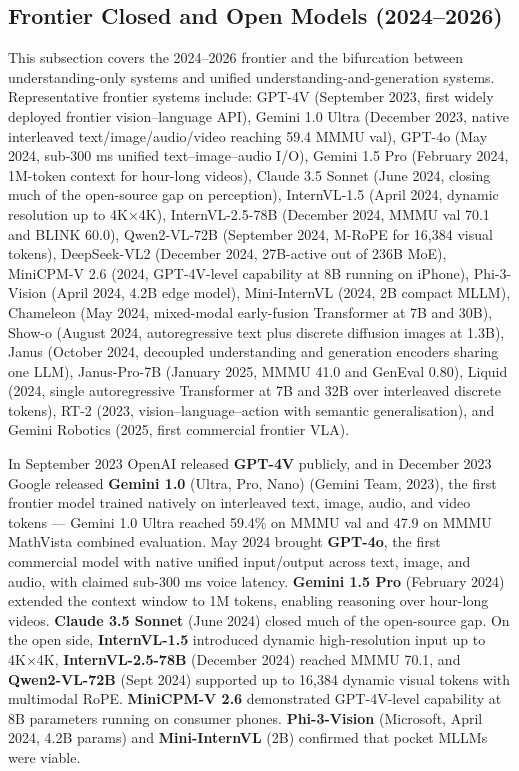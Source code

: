 \documentclass{article}
\begin{document}
\subsection{Frontier Closed and Open Models (2024--2026)}\label{frontier-closed-and-open-models-20242026}

This subsection covers the 2024--2026 frontier and the bifurcation between understanding-only systems and unified understanding-and-generation systems. Representative frontier systems include: GPT-4V (September 2023, first widely deployed frontier vision--language API), Gemini 1.0 Ultra (December 2023, native interleaved text/image/audio/video reaching 59.4 MMMU val), GPT-4o (May 2024, sub-300 ms unified text--image--audio I/O), Gemini 1.5 Pro (February 2024, 1M-token context for hour-long videos), Claude 3.5 Sonnet (June 2024, closing much of the open-source gap on perception), InternVL-1.5 (April 2024, dynamic resolution up to 4K×4K), InternVL-2.5-78B (December 2024, MMMU val 70.1 and BLINK 60.0), Qwen2-VL-72B (September 2024, M-RoPE for 16,384 visual tokens), DeepSeek-VL2 (December 2024, 27B-active out of 236B MoE), MiniCPM-V 2.6 (2024, GPT-4V-level capability at 8B running on iPhone), Phi-3-Vision (April 2024, 4.2B edge model), Mini-InternVL (2024, 2B compact MLLM), Chameleon (May 2024, mixed-modal early-fusion Transformer at 7B and 30B), Show-o (August 2024, autoregressive text plus discrete diffusion images at 1.3B), Janus (October 2024, decoupled understanding and generation encoders sharing one LLM), Janus-Pro-7B (January 2025, MMMU 41.0 and GenEval 0.80), Liquid (2024, single autoregressive Transformer at 7B and 32B over interleaved discrete tokens), RT-2 (2023, vision--language--action with semantic generalisation), and Gemini Robotics (2025, first commercial frontier VLA).

In September 2023 OpenAI released \textbf{GPT-4V} publicly, and in December 2023 Google released \textbf{Gemini 1.0} (Ultra, Pro, Nano) (Gemini Team, 2023), the first frontier model trained natively on interleaved text, image, audio, and video tokens --- Gemini 1.0 Ultra reached 59.4\% on MMMU val and 47.9 on MMMU MathVista combined evaluation. May 2024 brought \textbf{GPT-4o}, the first commercial model with native unified input/output across text, image, and audio, with claimed sub-300 ms voice latency. \textbf{Gemini 1.5 Pro} (February 2024) extended the context window to 1M tokens, enabling reasoning over hour-long videos. \textbf{Claude 3.5 Sonnet} (June 2024) closed much of the open-source gap. On the open side, \textbf{InternVL-1.5} \citep{chen20242024} introduced dynamic high-resolution input up to 4K×4K, \textbf{InternVL-2.5-78B} (December 2024) reached MMMU 70.1, and \textbf{Qwen2-VL-72B} (Sept 2024) supported up to 16,384 dynamic visual tokens with multimodal RoPE. \textbf{MiniCPM-V 2.6} \citep{yao20242024} demonstrated GPT-4V-level capability at 8B parameters running on consumer phones. \textbf{Phi-3-Vision} (Microsoft, April 2024, 4.2B params) and \textbf{Mini-InternVL} (2B) confirmed that pocket MLLMs were viable.
\end{document}
